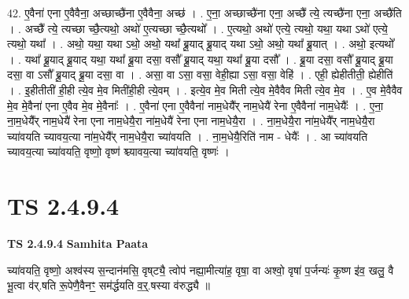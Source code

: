 \documentclass[17pt]{extarticle}
\begin{document}
42. ए॒वैना॑ एना ए॒वैवैना॒ अच्छाच्छै॑ना ए॒वैवैना॒ अच्छ॑ । . ए॒ना॒ अच्छाच्छै॑ना एना॒ अच्छै᳚ त्ये॒ त्यच्छै॑ना एना॒ अच्छै॑ति । . अच्छै᳚ त्ये॒ त्यच्छा च्छै॒त्यथो॒ अथो॑ ए॒त्यच्छा च्छै॒त्यथो᳚ । . ए॒त्यथो॒ अथो॑ एत्ये॒ त्यथो॒ यथा॒ यथा ऽथो॑ एत्ये॒ त्यथो॒ यथा᳚ । . अथो॒ यथा॒ यथा ऽथो॒ अथो॒ यथा᳚ ब्रू॒याद् ब्रू॒याद् यथा ऽथो॒ अथो॒ यथा᳚ ब्रू॒यात् । . अथो॒ इत्यथो᳚ । . यथा᳚ ब्रू॒याद् ब्रू॒याद् यथा॒ यथा᳚ ब्रू॒या दसा॒ वसौ᳚ ब्रू॒याद् यथा॒ यथा᳚ ब्रू॒या दसौ᳚ । . ब्रू॒या दसा॒ वसौ᳚ ब्रू॒याद् ब्रू॒या दसा॒ वा ऽसौ᳚ ब्रू॒याद् ब्रू॒या दसा॒ वा । . असा॒ वा ऽसा॒ वसा॒ वेही॒ह्या ऽसा॒ वसा॒ वेहि॑ । . एही॒ ह्येहीतीती॒ ह्येहीति॑ । . इ॒हीतीती॑ ही॒ही त्ये॒व मे॒व मिती॑ही॒ही त्ये॒वम् । . इत्ये॒व मे॒व मिती त्ये॒व मे॒वैवैव मिती त्ये॒व मे॒व । . ए॒व मे॒वैवैव मे॒व मे॒वैना॑ एना ए॒वैव मे॒व मे॒वैनाः᳚ । . ए॒वैना॑ एना ए॒वैवैना॑ नाम॒धेयै᳚र् नाम॒धेयै॑ रेना ए॒वैवैना॑ नाम॒धेयैः᳚ । . ए॒ना॒ ना॒म॒धेयै᳚र् नाम॒धेयै॑ रेना एना नाम॒धेयै॒रा ना॑म॒धेयै॑ रेना एना नाम॒धेयै॒रा । . ना॒म॒धेयै॒रा ना॑म॒धेयै᳚र् नाम॒धेयै॒रा च्या॑वयति च्यावय॒त्या ना॑म॒धेयै᳚र् नाम॒धेयै॒रा च्या॑वयति । . ना॒म॒धेयै॒रिति॑ नाम - धेयैः᳚ । . आ च्या॑वयति च्यावय॒त्या च्या॑वयति॒ वृष्णो॒ वृष्ण॑ श्च्यावय॒त्या च्या॑वयति॒ वृष्णः॑ । \newline
\pagebreak
{}

\section{ TS 2.4.9.4 }

\textbf{TS 2.4.9.4 } \newline
\textbf{Samhita Paata} \newline

च्या॑वयति॒ वृष्णो॒ अश्व॑स्य स॒न्दान॑मसि॒ वृष्‌ट्यै॒ त्वोप॑ नह्या॒मीत्या॑ह॒ वृषा॒ वा अश्वो॒ वृषा॑ प॒र्जन्यः॑ कृ॒ष्ण इ॑व॒ खलु॒ वै भू॒त्वा व॑र्.षति रू॒पेणै॒वैनꣳ॒॒ सम॑र्द्धयति व॒र्॒.षस्या व॑रुद्ध्यै ॥ \newline
\end{document}

